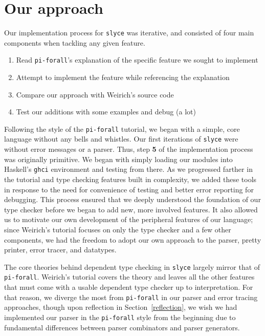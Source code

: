 \section{Our approach}
Our implementation process for \texttt{slyce} was iterative, and consisted of four main components when tackling any given feature.
\begin{enumerate}
    \item Read \texttt{pi-forall}'s explanation of the specific feature we sought to implement
    \item Attempt to implement the feature while referencing the explanation
    \item Compare our approach with Weirich's source code
    \item Test our additions with some examples and debug (a lot)
\end{enumerate}

Following the style of the \texttt{pi-forall} tutorial, we began with a simple, core language without any bells and whistles.
Our first iterations of \texttt{slyce} were without error messages or a parser.
Thus, step \textbf{5} of the implementation process was originally primitive. 
We began with simply loading our modules into Haskell's \texttt{ghci} environment and testing from there.
As we progressed farther in the tutorial and type checking features built in
complexity, we added these tools in response to the need for convenience of
testing and
better error reporting for debugging.
This process ensured that we deeply understood the foundation of our type checker before we began to add new, more involved features. 
It also allowed us to motivate our own development of the peripheral features
of our language; since Weirich's tutorial focuses on only the type checker and
a few other components, we had the freedom to adopt our own approach to the
parser, pretty printer, error tracer, and datatypes.

The core theories behind dependent type checking in \texttt{slyce} largely mirror that of \texttt{pi-forall}.
Weirich's tutorial covers the theory and leaves all the other features that
must come with a usable dependent type checker up to interpretation.
For that reason, we diverge the most from \texttt{pi-forall} in our parser and
error tracing approaches, though upon reflection in Section~\ref{reflection},
we wish we had implemented our parser in the \texttt{pi-forall} style from the
beginning due to fundamental differences between parser combinators and parser
generators.
